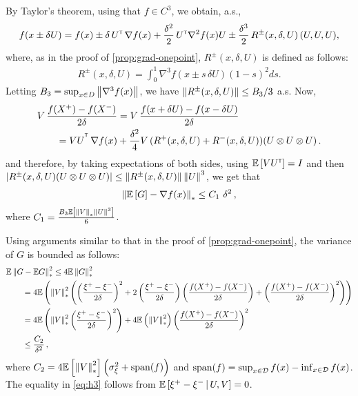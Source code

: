 By Taylor's theorem, using that $f\in C^3$, we obtain, a.s.,
\begin{align*}
f(x \pm \delta U) =
 f(x)
 \pm\delta\,  U^\mathsf{\scriptscriptstyle T}\,\nabla f(x)
  + \frac{\delta^2}{2}\, U^\mathsf{\scriptscriptstyle T} \nabla^2 f(x) U
  \pm  \frac{\delta^3}{2} \, R^{\pm}(x,\delta,U) \,(U, U, U),
\end{align*}
where, as in the proof of \cref{prop:grad-onepoint}, $R^{\pm}(x,\delta,U)$ is defined as follows:
\begin{align}
 R^{\pm}(x,\delta,U)= \int_0^1  \nabla^3 f(  x \pm s \, \delta U ) (1-s)^2 ds. \label{eq:taylor-r-1p}
\end{align}
Letting $B_3 = \sup_{x\in D} \left\| \nabla^3 f(x) \right\|$,%
we have $\left\| R^{\pm}(x,\delta,U)\right\| \le B_3/3$ a.s.
Now,
\begin{align}
\begin{split}
\MoveEqLeft       V\, \dfrac{f(X^+)-f(X^-)}{2\delta}
  = V\, \dfrac{f(x+\delta U) - f(x-\delta U)}{2\delta} \\
&= VU^{\tr}
\, \nabla f(x)   +   \frac{\delta^2}{4}  V \,(R^{+}(x,\delta,U)+R^{-}(x,\delta,U))(U \otimes U \otimes U)\,.
\end{split}
\label{eq:l1}
\end{align}
and therefore,
by taking expectations of both sides,
using $\mathbb{E}\left[V U^\mathsf{\scriptscriptstyle T}\right] = I$ and then $|R^{\pm}(x,\delta,U) (U \otimes U \otimes U)| \le
\left\|R^{\pm}(x,\delta,U)\right\| \left\|U\right\|^3$,
we get that
\begin{align*}
\left\| \mathbb{E}\left[ G \right] - \nabla f(x) \right\|_*
\le C_1\,\, \delta^2 \,,
\end{align*}
where $C_1 = \frac{B_3 \mathbb{E}\left[ \left\|V\right\|_* \left\|U\right\|^3 \right]}{6}$.

Using arguments similar to that in the proof of \cref{prop:grad-onepoint}, the variance of $G$ is bounded as follows:
\begin{align}
\MoveEqLeft \E\left\| G - \E G\right\|_*^2
 \le 4 \E \left\|G\right\|_*^2 \nonumber \\
& =  4\E\left( \left\| V \right\|_*^2 \left(\left(\dfrac{\xi^+ - \xi^-}{2\delta}\right)^2  + 2 \left(\dfrac{\xi^+ - \xi^-}{2\delta}\right) \left(\dfrac{f(X^+) - f(X^-)}{2\delta}\right)
+ \left( \dfrac{f(X^+) - f(X^-)}{2\delta} \right)^2 \right)\right) \nonumber \\
&=  4\E\left( \left\| V \right\|_*^2 \left(\dfrac{\xi^+ - \xi^-}{2\delta}\right)^2\right)
+ 4 \E \left(\left\| V \right\|_*^2 \right)\left( \dfrac{f(X^+) - f(X^-)}{2\delta} \right)^2  \label{eq:h3} \\
& \le  \frac{C_2}{\delta^2}\,, \nonumber \label{eq:h4}
\end{align}
where $C_2 = 4 \mathbb{E}\left[\left\|V\right\|_*^2\right]\left( \sigma_\xi^2+\operatorname{span}(f)\right)$
and $\operatorname{span}(f) = \sup_{x\in \mathcal{D}} f(x) - \inf_{x\in \mathcal{D}} f(x)$.
The equality in \eqref{eq:h3} follows from $\mathbb{E}\left[ \xi^+-\xi^- \,|\, U,V \right] = 0$.

